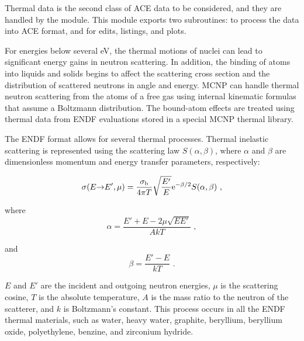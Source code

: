 Thermal data is the second class of ACE data to be considered,
and they are handled by the 
module.  This module exports two subroutines:
 to process the data into
ACE format, and  for edits,
listings, and plots.

For energies below several eV, the thermal motions of nuclei can
lead to significant energy gains in neutron scattering.  In addition,
the binding of atoms into liquids and solids begins to affect the
scattering cross section and the distribution of scattered neutrons
in angle and energy.  MCNP can handle thermal neutron scattering
from the atoms of a free gas using internal
kinematic formulas that assume a Boltzmann distribution.
The bound-atom effects are treated using thermal data from ENDF
evaluations stored in a special MCNP thermal library.

The ENDF format allows for several thermal processes.  Thermal
inelastic scattering is represented using
the scattering law $S(\alpha,\beta)$, where
$\alpha$ and $\beta$ are dimensionless momentum and energy transfer
parameters, respectively:

\begin{equation}
  \sigma(E{\rightarrow}E',\mu)=\frac{\sigma_{\rm b}}
   {4\pi T}\sqrt{\frac{E'}{E}}{\rm e}^{-\beta/2}S(\alpha,\beta)\,\,,
\end{equation}
\vspace{0.5 pt}

\noindent
where
\begin{equation}
  \alpha=\frac{E'+E-2\mu\sqrt{EE'}}{AkT}\,\,,
\end{equation}
\vspace{0.5 pt}

\noindent and
\begin{equation}
  \beta=\frac{E'-E}{kT}\,\,.
\end{equation}
\vspace{0.5 pt}

\noindent
$E$ and $E'$ are the incident and outgoing neutron
energies, $\mu$ is the scattering cosine, $T$ is the absolute
temperature, $A$ is the mass ratio to the neutron of the
scatterer, and $k$ is Boltzmann's constant.  This process
occurs in all the ENDF thermal materials, such as water,
heavy water, graphite, beryllium, beryllium oxide, polyethylene,
benzine, and zirconium hydride.

